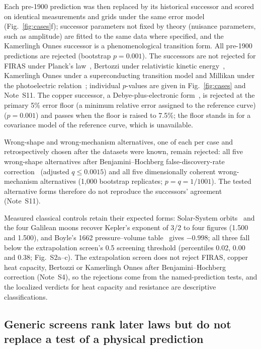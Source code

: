 \documentclass{article}
\begin{document}
Each pre-1900 prediction was then replaced by its historical successor and scored on identical measurements and grids under the same error model (Fig.~\ref{fig:cases}f); successor parameters not fixed by theory (nuisance parameters, such as amplitude) are fitted to the same data where specified, and the Kamerlingh Onnes successor is a phenomenological transition form. All pre-1900 predictions are rejected (bootstrap $p = 0.001$). The successors are not rejected for FIRAS under Planck's law~\cite{planck1901}, Bertozzi under relativistic kinetic energy~\cite{einstein1905relativity}, Kamerlingh Onnes under a superconducting transition model and Millikan under the photoelectric relation~\cite{einstein1905photoelectric}; individual $p$-values are given in Fig.~\ref{fig:cases} and Note~S11. The copper successor, a Debye-plus-electronic form~\cite{debye1912}, is rejected at the primary 5\% error floor (a minimum relative error assigned to the reference curve) ($p = 0.001$) and passes when the floor is raised to 7.5\%; the floor stands in for a covariance model of the reference curve, which is unavailable.

Wrong-shape and wrong-mechanism alternatives, one of each per case and retrospectively chosen after the datasets were known, remain rejected: all five wrong-shape alternatives after Benjamini--Hochberg false-discovery-rate correction~\cite{benjamini1995fdr} (adjusted $q \leq 0.0015$) and all five dimensionally coherent wrong-mechanism alternatives (1,000 bootstrap replicates; $p = q = 1/1001$). The tested alternative forms therefore do not reproduce the successors' agreement (Note~S11).

Measured classical controls retain their expected forms: Solar-System orbits~\cite{kepler1619} and the four Galilean moons recover Kepler's exponent of 3/2 to four figures (1.500 and 1.500), and Boyle's 1662 pressure--volume table~\cite{boyle1662} gives $-0.998$; all three fall below the extrapolation screen's 0.5 screening threshold (percentiles 0.02, 0.00 and 0.38; Fig.~S2a--c). The extrapolation screen does not reject FIRAS, copper heat capacity, Bertozzi or Kamerlingh Onnes after Benjamini--Hochberg correction (Note~S4), so the rejections come from the named-prediction tests, and the localized verdicts for heat capacity and resistance are descriptive classifications.

\subsection{Generic screens rank later laws but do not replace a test of a physical prediction}
\end{document}
